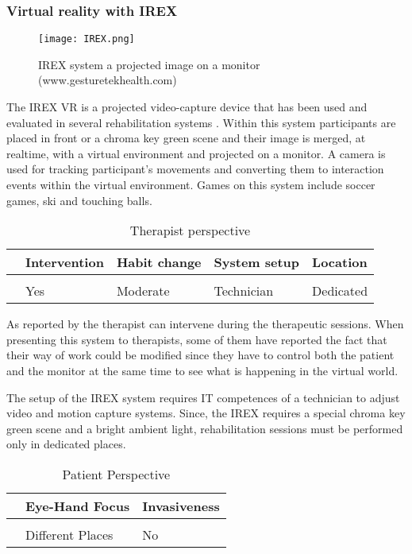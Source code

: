 \documentclass[preprint,authoryear,12pt]{elsarticle}
\begin{document}
\par
\subsubsection{Virtual reality with IREX}
\par
\begin{figure}[h]
	\centering
		\texttt{[image: IREX.png]}
	\caption{IREX system a projected image on a monitor (www.gesturetekhealth.com) }
	\label{fig:manus}
\end{figure}

The IREX VR \citep{IREX} is a projected video-capture device that has been used and evaluated in several rehabilitation systems \citep{Kizony2005,Reid2004}.
Within this system participants are placed in front or a chroma key green scene and their image is merged, at realtime, with a virtual environment and projected on a monitor. A camera is used for tracking participant's movements and converting them to interaction events within the virtual environment. Games on this system include soccer games, ski and touching balls.

\begin{table}[h]
\caption{Therapist perspective}
\center
\label{tab:theraper}
\begin{tabular}{|l|l|l|l|l|}
\hline
& Intervention & Habit change & System setup &	Location \\
\hline
\citep{Kizony2005} & & & &\\
\citep{Reid2004} & Yes &  Moderate	 & Technician	 & Dedicated\\
\hline
\end{tabular}
\end{table}

As reported by \citep{Kizony2005} the therapist can intervene during the therapeutic sessions. When presenting this system to therapists, some of them have reported the fact that their way of work could be modified since they have to control both the patient and the monitor at the same time to see what is happening in the virtual world.

The setup of the IREX system requires IT competences of a technician to adjust video and motion capture systems. Since, the IREX requires a special chroma key green scene and a bright ambient light, rehabilitation sessions must be performed only in dedicated places.
 
\begin{table}[h]
\caption{Patient Perspective}
\center
\label{tab:pataper}
\begin{tabular}{|l|l|l|}
\hline
 & Eye-Hand  Focus & Invasiveness \\
\hline
\citep{Kizony2005} & &\\
\citep{Reid2004} & Different Places &  No\\
\hline
\end{tabular}
\end{table}
\end{document}
